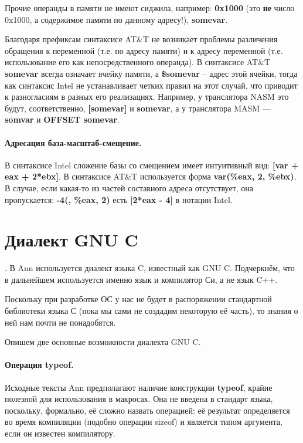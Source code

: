 Прочие операнды в памяти не имеют сиджила, например: \textbf{0x1000} (это \textbf{не}
число 0x1000, а содержимое памяти по данному адресу!), \textbf{somevar}.

Благодаря префиксам синтаксисе AT\&T не возникает проблемы
различения обращения к переменной (т.е. по адресу памяти) и к адресу переменной
(т.е. использование его как непосредственного операнда). В синтаксисе
AT\&T \textbf{somevar} всегда означает ячейку памяти, а \textbf{\$somevar} -- адрес этой ячейки,
тогда как синтаксис Intel не устанавливает четких правил
на этот случай, что приводит к разногласиям в разных его реализациях.
Например, у транслятора NASM это будут, соответственно, \textbf{[somevar]} и
\textbf{somevar}, а у транслятора MASM — \textbf{somvar} и \textbf{OFFSET somevar}.

\paragraph{Адресация база-масштаб-смещение.}
В синтаксисе Intel сложение базы со смещением имеет интуитивный вид:
\textbf{[var + eax + 2*ebx]}. В синтаксисе AT\&T используется форма
\textbf{var(\%eax, 2, \%ebx)}. В случае, если какая-то из частей составного
адреса отсутствует, она пропускается: \textbf{-4(, \%eax, 2)} есть \textbf{[2*eax - 4]} в нотации Intel.

\section{Диалект GNU C}.
В Ann используется диалект языка C, известный как GNU C. Подчеркнём, что в дальнейшем
используется именно язык и компилятор Си, а не язык C++.

Поскольку при разработке ОС у нас не будет в распоряжении стандартной
библиотеки языка С (пока мы сами не создадим некоторую её
часть), то знания о ней нам почти не понадобятся.

Опишем две основные возможности диалекта GNU C.

\paragraph{Операция typeof.} Исходные тексты Ann предполагают наличие
конструкции \textbf{typeof}, крайне полезной для использования в макросах. Она
не введена в стандарт языка, поскольку, формально, её сложно назвать операцией:
её результат определяется во время компиляции (подобно операции sizeof) и
является типом аргумента, если он известен компилятору.

